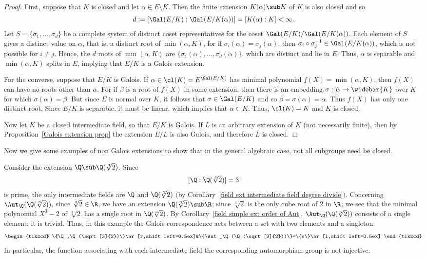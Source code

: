 \begin{proof}
First, suppose that $K$ is closed and let $\alpha\in E\setminus K$. Then the finite extension $K(\alpha)\sub K$ of $K$ is also closed and so
\[d:=[\Gal(E/K):\Gal(E/K(\alpha))]=[K(\alpha):K]<\infty.\]
Let $S=\{\sigma_1,\dots,\sigma_d\}$ be a complete system of distinct coset representatives for the coset $\Gal(E/K)/\Gal(E/K(\alpha))$. Each element of $S$ gives a distinct value on $\alpha$, that is, a distinct root of $\min(\alpha,K)$, for if $\sigma_i(\alpha)=\sigma_j(\alpha)$, then $\sigma_i\circ\sigma_j^{-1}\in\Gal(E/K(\alpha))$, which is not possible for $i\neq j$. Hence, the $d$ roots of $\min(\alpha,K)$ are $\{\sigma_1(\alpha),\dots,\sigma_d(\alpha)\}$, which are distinct and lie in $E$. Thus, $\alpha$ is separable and $\min(\alpha,K)$ splits in $E$, implying that $E/K$ is a Galois extension.\par
For the converse, suppose that $E/K$ is Galois. If $\alpha\in\cl(K)=E^{\Gal(E/K)}$ has minimal polynomial $f(X)=\min(\alpha,K)$, then $f(X)$ can have no roots other than $\alpha$. For if $\beta$ is a root of $f(X)$ in some extension, then there is an embedding $\sigma:E\to\widebar{K}$ over $K$ for which $\sigma(\alpha)=\beta$. But since $E$ is normal over $K$, it follows that $\sigma\in\Gal(E/K)$ and so $\beta=\sigma(\alpha)=\alpha$. Thus $f(X)$ has only one distinct root. Since $E/K$ is separable, it must be linear, which implies that $\alpha\in K$. Thus, $\cl(K)=K$ and $K$ is closed.\par
Now let $K$ be a closed intermediate field, so that $E/K$ is Galois. If $L$ is an arbitrary extension of $K$ (not necessarily finite), then by Proposition~\ref{Galois extension prop} the extension $E/L$ is also Galois, and therefore $L$ is closed.
\end{proof}
Now we give some examples of non Galois extensions to show that in the general algebraic case, not all subgroups need be closed.
\begin{example}\label{field ext no Galois eg}
Consider the extension $\Q\sub\Q(\sqrt[3]{2})$. Since
\[[\Q:\Q(\sqrt[3]{2})]=3\]
is prime, the only intermediate fields are $\Q$ and $\Q(\sqrt[3]{2})$ $($by Corollary~\ref{field ext intermediate field degree divide}$)$. Concerning $\Aut_\Q(\Q(\sqrt[3]{2}))$, since $\sqrt[3]{2}\in\R$, we have an extension $\Q(\sqrt[3]{2})\sub\R$; since $\sqrt[3]{2}$ is the only cube root of $2$ in $\R$, we see that the minimal polynomial $X^3-2$ of $\sqrt[3]{2}$ has a single root in $\Q(\sqrt[3]{2})$. By Corollary~\ref{field simple ext order of Aut}, $\Aut_\Q(\Q(\sqrt[3]{2}))$ consists of a single element: it is trivial. Thus, in this example the Galois correspondence acts between a set with two elements and a singleton:
\[\begin{tikzcd}
\{\Q,\Q(\sqrt[3]{2})\}\ar[r,shift left=0.5ex]&\{\Aut_\Q(\Q(\sqrt[3]{2}))\}=\{e\}\ar[l,shift left=0.5ex]
\end{tikzcd}\]
In particular, the function associating with each intermediate field the corresponding automorphism group is not injective.
\end{example}
